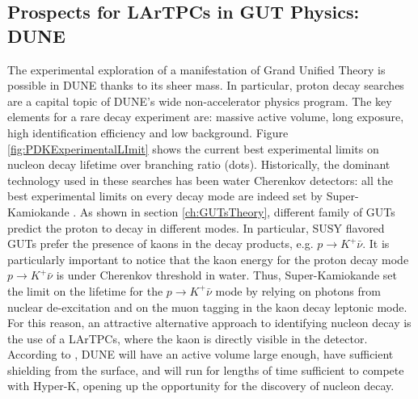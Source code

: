 \subsection{Prospects for LArTPCs in GUT Physics: DUNE}
The experimental exploration of a manifestation of Grand Unified Theory is possible in DUNE thanks to its sheer mass.  In particular, proton decay searches are a capital topic of DUNE's wide non-accelerator physics program.
The key elements for a rare decay experiment are: massive active volume, long exposure, high identification efficiency and low background. 
Figure \ref{fig:PDKExperimentalLImit} shows the current best experimental limits on nucleon decay lifetime over branching ratio (dots). Historically, the dominant technology used in these searches has been water Cherenkov detectors: all the best experimental limits on every decay mode are indeed set by Super-Kamiokande \cite{PhysRevD.90.072005,PhysRevLett.115.121803}.  As shown in section \ref{ch:GUTsTheory}, different family of GUTs predict the proton to decay in different modes. In particular, SUSY flavored GUTs prefer the presence of kaons in the decay products, e.g. $p \rightarrow K^+ \bar{\nu}$.
It is particularly important to notice that the kaon energy for the proton decay mode $p \rightarrow K^+ \bar{\nu}$ is under Cherenkov threshold in water.  Thus, Super-Kamiokande set the limit on the lifetime for the $p \rightarrow K^+ \bar{\nu}$ mode by  relying  on photons from nuclear de-excitation and on the muon tagging in the kaon decay leptonic mode. For this reason, an attractive alternative approach to identifying nucleon decay is the use of a LArTPCs, where the kaon is directly visible in the detector. 
According to \cite{Adams:2013qkq}, DUNE will have an active volume large enough, have sufficient shielding from the surface, and will run for lengths of time sufficient to compete with Hyper-K, opening up the opportunity for the discovery of nucleon decay. 

